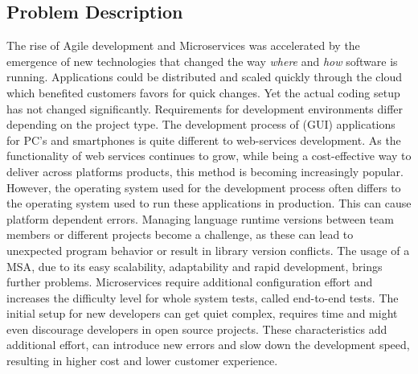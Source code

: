 \documentclass[12pt, a4paper]{article}
\begin{document}
    \subsection{Problem Description}
    The rise of Agile development and Microservices was accelerated by the emergence of new technologies that changed the way \textit{where} and \textit{how} software is running. Applications could be distributed and scaled quickly through the cloud which benefited customers favors for quick changes. Yet the actual coding setup has not changed significantly.\newline
    Requirements for development environments differ depending on the project type. The development process of (\acs{GUI}) applications for PC's and smartphones is quite different to web-services development. As the functionality of web services continues to grow, while being a cost-effective way to deliver across platforms products, this method is becoming increasingly popular. However, the operating system used for the development process often differs to the operating system used to run these applications in production. This can cause platform dependent errors. Managing language runtime versions between team members or different projects become a challenge, as these can lead to unexpected program behavior or result in library version conflicts. The usage of a \acl{MSA}, due to its easy scalability, adaptability and rapid development, brings further problems. Microservices require additional configuration effort and increases the difficulty level for whole system tests, called end-to-end tests. The initial setup for new developers can get quiet complex, requires time and might even discourage developers in open source projects.\newline
    These characteristics add additional effort, can introduce new errors and slow down the development speed, resulting in higher cost and lower customer experience.
\end{document}
